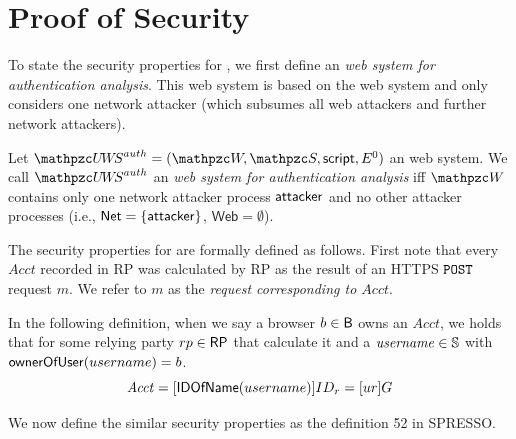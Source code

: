   
  \section{Proof of Security}
  
  To state the security properties for \uppresso, we first
  define an \emph{\uppresso web system for authentication analysis}. This
  web system is based on the \uppresso web system and only considers one
  network attacker (which subsumes all web attackers and further network
  attackers).
  
  \begin{definition}
    Let $\uppressoauthwebsystem = (\bidsystem, \scriptset, \mathsf{script}, E^0)$
    an \uppresso web system. We call $\uppressoauthwebsystem$ an
    \emph{\uppresso web system for authentication analysis} iff
    $\bidsystem$ contains only one network attacker process
    $\mathsf{attacker}$ and no other attacker processes (i.e.,
    $\mathsf{Net} = \{\mathsf{attacker}\}$, $\mathsf{Web} = \emptyset$).
  \end{definition}
  
  The security properties for \uppresso are formally defined 
  as follows. First note that every $Acct$ recorded in RP was
  calculated by RP as the result of an HTTPS $\mathtt{POST}$ request 
  $m$. We refer to $m$ as the 
  \emph{request corresponding to $Acct$}. 
  
  In the following definition, when we say a browser 
  $b\in \mathsf{B}$ owns an $Acct$, we holds that for some relying 
  party $rp\in \mathsf{RP}$ that calculate it and 
  a $\mathit{username} \in \mathbb{S}$ with $\mathsf{ownerOfUser}(username) = b$.
  \[\mathit{Acct}=[\mathsf{IDOfName}(username)]ID_r=[ur]G\]
  
  We now define the similar security properties as the definition 52 in SPRESSO. 
  
